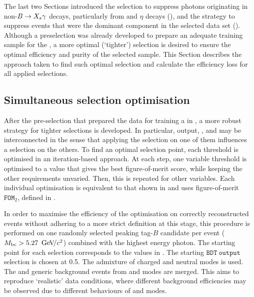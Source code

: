 The last two Sections introduced the selection to suppress photons originating in non-\mbox{$\BtoXsgamma$} decays, particularly from \piz and $\eta$ decays (),
and the strategy to suppress \mbox{\epem\ra\qqbar} events that were the dominant component in the selected data set ().
Although a preselection was already developed to prepare an adequate training sample for the \BDT, a more optimal (`tighter') selection is desired to ensure the optimal efficiency and purity of the selected sample.
This Section describes the approach taken to find such optimal selection and calculate the efficiency loss for all applied selections.

\subsection{Simultaneous selection optimisation}\label{sec:simultaneous_optimisation}

After the pre-selection that prepared the data for training a \BDT in , a more robust strategy for tighter selections is developed.
In particular, \BDT output, \piVeto, \etaVeto and \ZMVA may be interconnected in the sense that applying the selection on one of them influences a selection on the others. 
To find an optimal selection point, each threshold is optimised in an iteration-based approach. 
At each step, one variable threshold is optimised to a value that gives the best figure-of-merit score,
while keeping the other requirements unvaried.
Then, this is repeated for other variables.
Each individual optimisation is equivalent to that shown in  and uses figure-of-merit $\mathtt{FOM}_2$, defined in .

In order to maximise the efficiency of the optimisation on correctly reconstructed events without adhering to a more strict definition at this stage, 
this procedure is performed on one randomly selected peaking tag-$B$ candidate per event (${M_{\mathrm{bc}}} >5.27~{\mathrm{\,Ge\kern -0.1em V\!/}c^2}$) combined with the highest energy photon.
The starting point for each selection corresponds to the values in .
The starting $\mathtt{BDT~output}$ selection is chosen at 0.5. 
The \BtoXsgamma admixture of charged and neutral modes is used.
The \epem\ra\qqbar and generic \BB background events from \feiBp and \feiBz modes are merged.
This aims to reproduce `realistic' data conditions, where different background efficiencies may be observed due to different behaviours of \feiBp and \feiBz modes.

